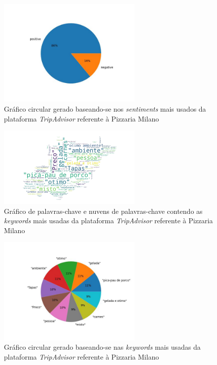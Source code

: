 \begin{figure}[!htb]
\centering
\includegraphics[width=7cm]{figuras/TripAdvisor/Restaurants/restaurant8_sentiments.jpeg}
\caption{Gráfico circular gerado baseando-se nos \textit{sentiments} mais usados da plataforma \textit{TripAdvisor} referente à Pizzaria Milano}
\label{fig:exemplofig}
\end{figure}

\begin{figure}[!htb]
\centering
\includegraphics[width=7cm]{figuras/TripAdvisor/Restaurants/restaurant8_keywordcloud.jpeg}
\caption{Gráfico de palavras-chave e nuvens de palavras-chave contendo as \textit{keywords} mais usadas da plataforma \textit{TripAdvisor} referente à Pizzaria Milano}
\label{fig:exemplofig}
\end{figure}

\begin{figure}[!htb]
\centering
\includegraphics[width=7cm]{figuras/TripAdvisor/Restaurants/restaurant8_keywords.jpeg}
\caption{Gráfico circular gerado baseando-se nas \textit{keywords} mais usadas da plataforma \textit{TripAdvisor} referente à Pizzaria Milano}
\label{fig:exemplofig}
\end{figure}

